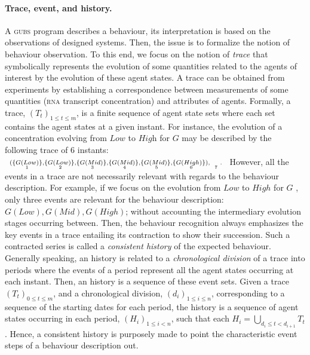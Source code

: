 \documentclass{eptcs}
\newcommand{\eg}[0]{\abbrev{\textit{e.g.}}}
\newcounter{ti}
\begin{document}
\paragraph{Trace, event, and history.} 
A \textsc{gubs} program describes a behaviour, its interpretation is based on the observations of designed systems. Then, the issue is to formalize the notion of behaviour observation. To this end, we focus on the notion of \emph{trace} that symbolically represents the evolution of some quantities related to the agents of interest by the evolution of these agent states. A trace can be obtained from experiments by establishing a correspondence between measurements of some quantities (\eg \textsc{rna} transcript concentration) and attributes of agents. Formally, a trace, $(T_t)_{1 \leq t \leq m}$, is a finite sequence of agent state sets where each set contains the agent states at a given instant. For instance, the evolution of a concentration evolving from $\textit{Low}$ to $\textit{High}$ for $G$ may be described by the following trace of $6$ instants: 
$
\renewcommand{\arraystretch}{0.5}
\scriptsize
\setlength{\doublerulesep}{\arrayrulewidth}
 \begin{array}[t]{ c @{} c @{} c @{} c @{} c @{} c @{} c}
(\{ G(Low) \}, & \{G(Low) \}, &\{G(Mid)\}, &\{G(Mid)\}, & \{G(Mid)\},& \{G(High)\}),& \hspace{4ex}. \\\scriptscriptstyle 1 & \scriptscriptstyle 2 & \scriptscriptstyle 3 & \scriptscriptstyle 4 & \scriptscriptstyle 5 & \scriptscriptstyle 6 & \scriptscriptstyle 7
\end{array}$
However, all the events in a trace are not necessarily relevant with regards to the behaviour description. For example, if we focus on the evolution from $\mathit{Low}$ to $\mathit{High}$ for $G$ , only three events are relevant for the behaviour description: $G(\mathit{Low}), G(\mathit{Mid}), G(\mathit{High})$; without accounting the intermediary evolution stages occurring between. Then, the behaviour recognition always emphasizes the key events in a trace entailing its contraction to show their succession. Such a contracted series is called a \emph{consistent history} of the expected behaviour. Generally speaking, an history is related to a \emph{chronological division} of a trace into periods where the events of a period represent all the agent states occurring at each instant.
Then, an history is a sequence of these event sets.
Given a trace $(T_t)_{0 \leq t \leq m}$, and a chronological division, $(d_i)_{1\leq i \leq n}$, corresponding to a sequence of the starting dates for each period, the history is a sequence of agent states occurring in each period, $(H_i)_{1 \leq i < n}$, such that each $H_i=\bigcup_{d_i \leq t < d_{i+1}} T_t$. Hence, a consistent history is purposely made to point the characteristic event steps of a behaviour description out.
\end{document}
